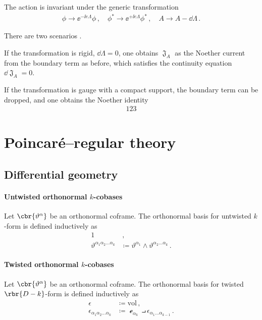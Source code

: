 \documentclass[a4paper]{article}
\begin{document}
The action is invariant under the generic transformation
\begin{align}
\phi \to \ee^{-\ii e \Lambda} \phi\,,\quad
\phi^* \to \ee^{+\ii e \Lambda} \phi^*\,,\quad
A \to A - \dd \Lambda\,.
\end{align}

There are two scenarios \cite{Avery2015}.

If the transformation is rigid, $\dd \Lambda = 0$, one obtains $\mfrakJ_A$ as 
the Noether current from the boundary term as before, which satisfies the 
continuity equation $\dd \mfrakJ_A = 0$.

If the transformation is gauge with a compact support, the boundary term can be
dropped, and one obtains the Noether identity
\begin{align}
123
\end{align}


\section{Poincaré--regular theory}


\subsection{Differential geometry}

\paragraph{Untwisted orthonormal $k$-cobases}
Let $\cbr{\vartheta^{\alpha}}$ be an orthonormal coframe. The orthonormal 
basis for untwisted $k$-form is defined inductively as
\begin{align}
1&\,, \\
\vartheta^{\alpha_{1}\alpha_{2}\ldots \alpha_{k}} &\coloneqq 
	\vartheta^{\alpha_{1}} \wedge \vartheta^{\alpha_{2}\ldots \alpha_{k}}\,.
\end{align}

\paragraph{Twisted orthonormal $k$-cobases}
Let $\cbr{\vartheta^{\alpha}}$ be an orthonormal coframe. The orthonormal 
basis for twisted $\rbr{D-k}$-form is defined inductively as
\begin{align}
\epsilon &\coloneqq \mathrm{vol}\,, \\
\epsilon_{\alpha_{1}\alpha_{2}\ldots \alpha_{k}} &\coloneqq
\mscre_{\alpha_{k}} \intprod \epsilon_{\alpha_{1}\ldots \alpha_{k-1}}\,.
\end{align}
\end{document}
